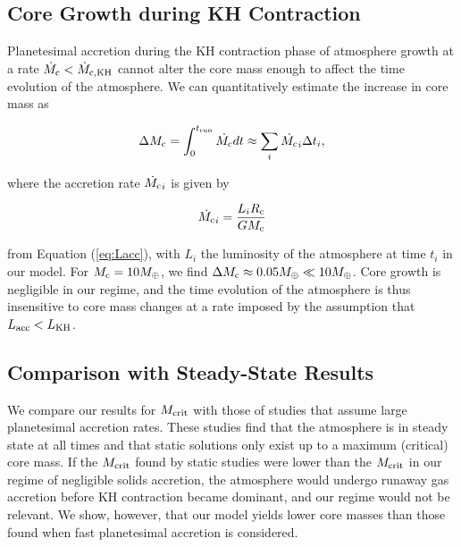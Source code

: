 \documentclass[apj]{emulateapj}
\newcommand{\co}{_{\rm c}}
\begin{document}
\subsection{Core Growth during KH Contraction}
\label{raf3}

Planetesimal accretion during the KH contraction phase of atmosphere growth at a rate $\dot{M}_{\rm c}<\dot{M}_{\rm{c,KH}}$  cannot alter the core mass enough to affect the time evolution of the atmosphere. We can quantitatively estimate the increase in core mass as 

\begin{equation}
\label{eq:cminc}
\Delta M_{\rm{c}} = \int_0^{t_{\rm{run}}} \dot{M_{\rm{c}}} dt \approx \sum_i \dot{M_{\rm{c}}}_i \Delta t_i,
\end{equation}
 
 \noindent where the accretion rate $ \dot{M_{\rm{c}}}_i $ is given by 
 
 \begin{equation}
 \label{eq:Mdotexp}
 \dot{M_{\rm{c}}}_i =\frac{L_i R\co}{G M_{\rm{c}}} 
 \end{equation}
 
 \noindent from Equation (\ref{eq:Lacc}), with $L_i$ the luminosity of the atmosphere at time $t_i$ in our model. For $M_{\rm{c}}=10 M_{\oplus}$, we find $\Delta M_{\rm{c}} \approx 0.05 M_{\oplus} \ll 10 M_{\oplus}$. Core growth is negligible in our regime, and the time evolution of the atmosphere is thus insensitive to core mass changes at a rate imposed by the assumption that $L_{\rm{acc}}<L_{\rm{KH}}$.



\subsection{Comparison with Steady-State Results}
\label{raf2}

We compare our results for $M_{\rm crit}$ with those of studies that assume large planetesimal accretion rates. These studies find that the atmosphere is in steady state at all times and that static solutions only exist up to a maximum (critical) core mass. If the $M_{\rm crit}$ found by static studies were lower than the $M_{\rm crit}$ in our regime of negligible solids accretion, the atmosphere would undergo runaway gas accretion before KH contraction became dominant, and our regime would not be relevant. We show, however, that our model yields lower core masses than those found when fast planetesimal accretion is considered. 
\end{document}
